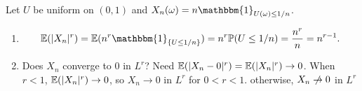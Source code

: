 \documentclass[10pt, a4paper]{article}
\begin{document}
\begin{example}
    Let $U$ be uniform on $(0, 1)$ and $X_n(\omega) = n\mathbbm{1}_{U(\omega) \leq 1 / n}$.

    \begin{enumerate}[label = (\roman*)]
        \item
        \[
        \E(|X_n| ^ r) = \E(n ^ r \mathbbm{1}_{\{U \leq 1 / n\}}) = n ^ r \P(U \leq 1 / n) = \frac{n ^ r}{n} = n ^ {r - 1}.
        \]

        \item Does $X_n$ converge to $0$ in $L ^ r$?
        Need $\mathbb{E}(|X_n - 0| ^ r) = \mathbb{E}(|X_n| ^ r) \to 0$.
        When $r < 1$,
        $\mathbb{E}(|X_n| ^ r) \to 0$,
        so $X_n \to 0$  in $L ^ r$ for $0 < r < 1$.
        otherwise,
        $X_n \centernot\to 0$ in $L ^ r$
    \end{enumerate}
\end{example}
\end{document}
